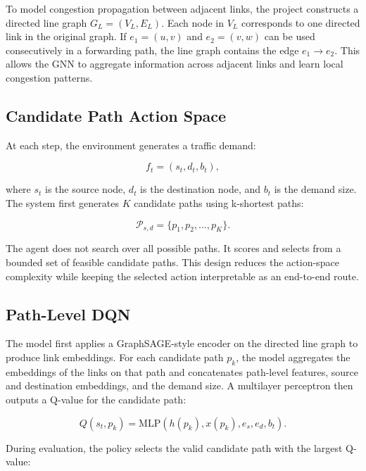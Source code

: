 \documentclass[9pt,a4paper,twocolumn,twoside]{rho-class/rho}
\begin{document}
To model congestion propagation between adjacent links, the project constructs a directed line graph $G_L=(V_L,E_L)$. Each node in $V_L$ corresponds to one directed link in the original graph. If $e_1=(u,v)$ and $e_2=(v,w)$ can be used consecutively in a forwarding path, the line graph contains the edge $e_1 \rightarrow e_2$. This allows the GNN to aggregate information across adjacent links and learn local congestion patterns.

\subsection{Candidate Path Action Space}

At each step, the environment generates a traffic demand:

\begin{equation}
f_t=(s_t,d_t,b_t),
\end{equation}

where $s_t$ is the source node, $d_t$ is the destination node, and $b_t$ is the demand size. The system first generates $K$ candidate paths using k-shortest paths:

\begin{equation}
\mathcal{P}_{s,d}=\{p_1,p_2,\ldots,p_K\}.
\end{equation}

The agent does not search over all possible paths. It scores and selects from a bounded set of feasible candidate paths. This design reduces the action-space complexity while keeping the selected action interpretable as an end-to-end route.

\subsection{Path-Level DQN}

The model first applies a GraphSAGE-style encoder on the directed line graph to produce link embeddings. For each candidate path $p_k$, the model aggregates the embeddings of the links on that path and concatenates path-level features, source and destination embeddings, and the demand size. A multilayer perceptron then outputs a Q-value for the candidate path:

\begin{equation}
Q(s_t,p_k)=\mathrm{MLP}\left(h(p_k),x(p_k),e_s,e_d,b_t\right).
\end{equation}

During evaluation, the policy selects the valid candidate path with the largest Q-value:
\end{document}
